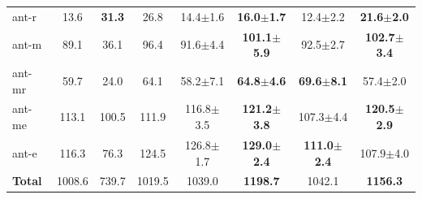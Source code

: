 \documentclass[11pt]{article}
\begin{document}
\begin{table}[htbp]
{\begin{tabular}{l|ccc|cc|cc}
    ant-r & 13.6 & \textbf{31.3} & 26.8 & 14.4$\pm$1.6 & \textbf{16.0$\pm$1.7} & 12.4$\pm$2.2 & \textbf{21.6$\pm$2.0} \\
    ant-m & 89.1 & 36.1 & 96.4 & 91.6$\pm$4.4 & \textbf{101.1$\pm$5.9} & 92.5$\pm$2.7 & \textbf{102.7$\pm$3.4} \\
    ant-mr & 59.7 & 24.0 & 64.1 & 58.2$\pm$7.1 & \textbf{64.8$\pm$4.6} & \textbf{69.6$\pm$8.1} & 57.4$\pm$2.0 \\
    ant-me & 113.1 & 100.5 & 111.9 & 116.8$\pm$3.5 & \textbf{121.2$\pm$3.8} & 107.3$\pm$4.4 & \textbf{120.5$\pm$2.9} \\
    ant-e & 116.3 & 76.3 & 124.5 & 126.8$\pm$1.7 & \textbf{129.0$\pm$2.4} & \textbf{111.0$\pm$2.4} & 107.9$\pm$4.0 \\ 
    \midrule
    \textbf{Total} & 1008.6 & 739.7 & 1019.5 & 1039.0 & \textbf{1198.7} & 1042.1 & \textbf{1156.3} \\ 
    \bottomrule
    \end{tabular}
}
\end{table}
\end{document}
